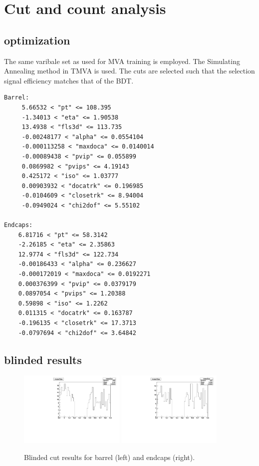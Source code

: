 \section{Cut and count analysis}

\subsection{optimization} 

The same varibale set as used for MVA training is employed.
The Simulating Annealing method in TMVA is used.
The cuts are selected such that the selection signal efficiency matches that of the BDT.

\begin{verbatim}
Barrel:
	 5.66532 < "pt" <= 108.395
	 -1.34013 < "eta" <= 1.90538
	 13.4938 < "fls3d" <= 113.735
	 -0.00248177 < "alpha" <= 0.0554104
	 -0.000113258 < "maxdoca" <= 0.0140014
	 -0.00089438 < "pvip" <= 0.055899
	 0.0869982 < "pvips" <= 4.19143
	 0.425172 < "iso" <= 1.03777
	 0.00903932 < "docatrk" <= 0.196985
	 -0.0104609 < "closetrk" <= 8.94004
	 -0.0949024 < "chi2dof" <= 5.55102

Endcaps:
	6.81716 < "pt" <= 58.3142
	-2.26185 < "eta" <= 2.35863
	12.9774 < "fls3d" <= 122.734
	-0.00186433 < "alpha" <= 0.236627
	-0.000172019 < "maxdoca" <= 0.0192271
	0.000376399 < "pvip" <= 0.0379179
	0.0897054 < "pvips" <= 1.20388
	0.59898 < "iso" <= 1.2262
	0.011315 < "docatrk" <= 0.163787
	-0.196135 < "closetrk" <= 17.3713
	-0.0797694 < "chi2dof" <= 3.64842
\end{verbatim}

\subsection{blinded results}


\begin{figure}[!h]
  \centering
  \includegraphics[width=0.45\textwidth]{Figures/cnt/SA_barrel_mass}
  \includegraphics[width=0.45\textwidth]{Figures/cnt/SA_endcaps_mass}
\caption{Blinded cut results for barrel (left) and endcaps (right).}
\end{figure}


